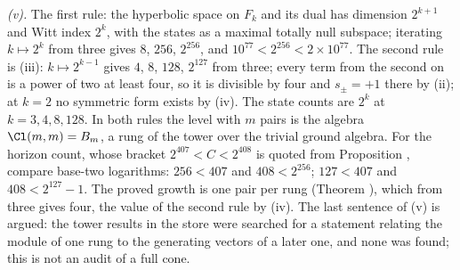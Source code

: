 \emph{(v).} The first rule: the hyperbolic space on $F_{k}$ and its dual has dimension $2^{k+1}$ and Witt index $2^{k}$, with the states as a maximal totally null subspace; iterating $k \mapsto 2^{k}$ from three gives $8$, $256$, $2^{256}$, and $10^{77} < 2^{256} < 2 \times 10^{77}$. The second rule is (iii): $k \mapsto 2^{k-1}$ gives $4$, $8$, $128$, $2^{127}$ from three; every term from the second on is a power of two at least four, so it is divisible by four and $s_{\pm} = +1$ there by (ii); at $k = 2$ no symmetric form exists by (iv). The state counts are $2^{k}$ at $k = 3, 4, 8, 128$. In both rules the level with $m$ pairs is the algebra $\Cl(m, m) = B_{m}$, a rung of the tower over the trivial ground algebra. For the horizon count, whose bracket $2^{407} < C < 2^{408}$ is quoted from Proposition , compare base-two logarithms: $256 < 407$ and $408 < 2^{256}$; $127 < 407$ and $408 < 2^{127} - 1$. The proved growth is one pair per rung (Theorem ), which from three gives four, the value of the second rule by (iv). The last sentence of (v) is argued: the tower results in the store were searched for a statement relating the module of one rung to the generating vectors of a later one, and none was found; this is not an audit of a full cone.
